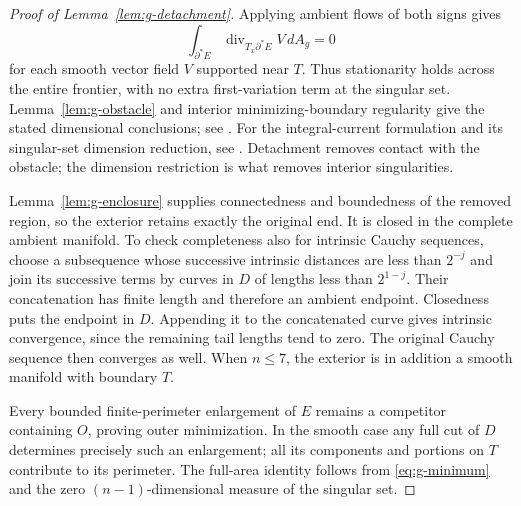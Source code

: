 \begin{proof}[Proof of Lemma~\ref{lem:g-detachment}]
Applying ambient flows
of both signs gives
\[
 \int_{\partial^*E}\operatorname{div}_{T_x\partial^*E}V\,dA_g=0
\]
for each smooth vector field $V$ supported near $T$.  Thus stationarity
holds across the entire frontier, with no extra first-variation term
at the singular set.  Lemma~\ref{lem:g-obstacle} and interior
minimizing-boundary regularity give the stated dimensional conclusions;
see \cite[Chapter~7, Theorem~5.8]{SimonGMT}.  For the integral-current
formulation and its singular-set dimension reduction, see
\cite{Federer1969,Federer1970}.
Detachment removes contact with the obstacle; the dimension restriction
is what removes interior singularities.

Lemma~\ref{lem:g-enclosure} supplies connectedness and boundedness of
the removed region, so the exterior retains exactly the original
end.  It is closed in the complete ambient manifold.  To check
completeness also for intrinsic Cauchy sequences, choose a subsequence
whose successive intrinsic distances are less than $2^{-j}$ and
join its successive terms by curves in $D$ of lengths less than
$2^{1-j}$.  Their concatenation has finite length and therefore an
ambient endpoint.  Closedness puts the endpoint in $D$.  Appending
it to the concatenated curve gives intrinsic convergence, since the
remaining tail lengths tend to zero.  The original Cauchy sequence
then converges as well.  When $n\le7$, the exterior is in addition a
smooth manifold with boundary $T$.

Every bounded finite-perimeter enlargement of $E$ remains a
competitor containing $O$, proving outer minimization.  In the smooth
case any full cut of $D$ determines precisely such an enlargement;
all its components and portions on $T$ contribute to its perimeter.
The full-area identity follows from \eqref{eq:g-minimum} and the
zero $(n-1)$-dimensional measure of the singular set.
\end{proof}
